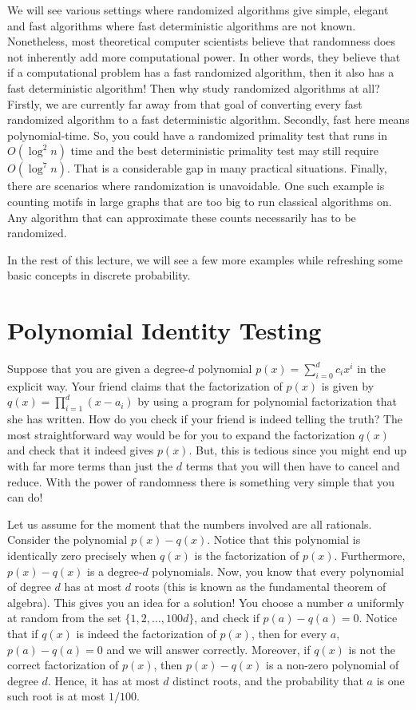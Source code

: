 We will see various settings where randomized algorithms give simple, elegant and fast algorithms where fast deterministic algorithms are not known. Nonetheless, most theoretical computer scientists believe that randomness does not inherently add more computational power. In other words, they believe that if a computational problem has a fast randomized algorithm, then it also has a fast deterministic algorithm! Then why study randomized algorithms at all? Firstly, we are currently far away from that goal of converting every fast randomized algorithm to a fast deterministic algorithm. Secondly, fast here means polynomial-time. So, you could have a randomized primality test that runs in $O(\log^2 n)$ time and the best deterministic primality test may still require $O(\log^7 n)$. That is a considerable gap in many practical situations. Finally, there are scenarios where randomization is unavoidable. One such example is counting motifs in large graphs that are too big to run classical algorithms on. Any algorithm that can approximate these counts necessarily has to be randomized. 

In the rest of this lecture, we will see a few more examples while refreshing some basic concepts in discrete probability.

\section{Polynomial Identity Testing}

Suppose that you are given a degree-$d$ polynomial $p(x) = \sum_{i=0}^d c_i x^i$ in the explicit way. Your friend claims that the factorization of $p(x)$ is given by $q(x) = \prod_{i=1}^d (x-a_i)$ by using a program for polynomial factorization that she has written. How do you check if your friend is indeed telling the truth? The most straightforward way would be for you to expand the factorization $q(x)$ and check that it indeed gives $p(x)$. But, this is tedious since you might end up with far more terms than just the $d$ terms that you will then have to cancel and reduce. With the power of randomness there is something very simple that you can do!

Let us assume for the moment that the numbers involved are all rationals. Consider the polynomial $p(x) -q(x)$. Notice that this polynomial is identically zero precisely when $q(x)$ is the factorization of $p(x)$. Furthermore, $p(x) - q(x)$ is a degree-$d$ polynomials. Now, you know that every polynomial of degree $d$ has at most $d$ roots (this is known as the fundamental theorem of algebra). This gives you an idea for a solution! You choose a number $a$ uniformly at random from the set $\{1,2,\ldots,100d\}$, and check if $p(a)-q(a)=0$. Notice that if $q(x)$ is indeed the factorization of $p(x)$, then for every $a$, $p(a) - q(a)=0$ and we will answer correctly. Moreover, if $q(x)$ is not the correct factorization of $p(x)$, then $p(x)-q(x)$ is a non-zero polynomial of degree $d$. Hence, it has at most $d$ distinct roots, and the probability that $a$ is one such root is at most $1/100$.

